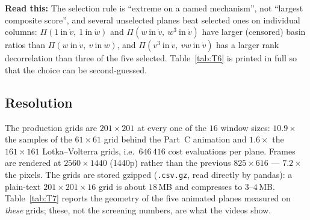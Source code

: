 \documentclass[10pt]{article}
\newcommand{\readthis}[1]{\textbf{Read this:} #1}
\begin{document}
\readthis{The selection rule is ``extreme on a named mechanism'', not ``largest composite score'', and
several unselected planes beat selected ones on individual columns: $\Pi(1\ \text{in}\ \dot v,\ 1\ \text{in}\
\dot w)$ and $\Pi(w\ \text{in}\ \dot v,\ w^3\ \text{in}\ \dot v)$ have larger (censored) basin ratios than
$\Pi(w\ \text{in}\ \dot v,\ v\ \text{in}\ \dot w)$, and $\Pi(v^3\ \text{in}\ \dot v,\ vw\ \text{in}\ \dot v)$ has a
larger rank decorrelation than three of the five selected. Table~\ref{tab:T6} is printed in full so that
the choice can be second-guessed.}

\begin{table}[H]\centering\small
\caption{\textbf{The complete landscape-plane screen} (FHN, $61\times61$, all 16 candidates, none
omitted). Columns as defined in \S\ref{sec:anim2defs}: rank decorrelation $1-\rho_{1,100}$, basin
fraction $\beta_\kappa$ and plateau fraction $\varphi_\kappa$ at the two ends of the ladder, and the
dynamic range $D_\kappa$ in decades. A basin of $0.027\,\%$ is exactly one grid cell --- the censoring
floor of this grid --- so the implied shrink factors of those rows are lower bounds;
Table~\ref{tab:T7} re-measures the animated planes without censoring. ``animated'' marks the five planes
carried to $201\times201$. Data: \texttt{landscape\_plane\_screen\_summary.csv}, script
\texttt{analysis/12\_landscape\_planes.jl}.}
\label{tab:T6}

\end{table}

\subsection{Resolution}
The production grids are $201\times201$ at every one of the $16$ window sizes: $10.9\times$ the samples
of the $61\times61$ grid behind the Part~C animation and $1.6\times$ the $161\times161$ Lotka--Volterra
grids, i.e.\ $646\,416$ cost evaluations per plane. Frames are rendered at $2560\times1440$ (1440p)
rather than the previous $825\times616$ --- $7.2\times$ the pixels. The grids are stored gzipped
(\texttt{.csv.gz}, read directly by pandas): a plain-text $201\times201\times16$ grid is about $18$\,MB
and compresses to $3$--$4$\,MB. Table~\ref{tab:T7} reports the geometry of the five animated planes
measured on \emph{these} grids; these, not the screening numbers, are what the videos show.
\end{document}
